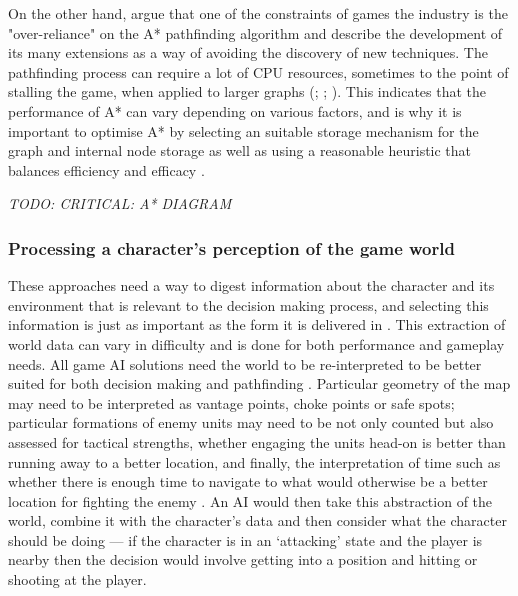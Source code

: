 \documentclass[11pt, a4paper]{article}
\begin{document}
On the other hand, \citeauthor{graham2003pathfinding} \parencite*[68]{graham2003pathfinding} argue that one of the constraints of games the industry is the "over-reliance" on the A* pathfinding algorithm and describe the development of its many extensions as a way of avoiding the discovery of new techniques. The pathfinding process can require a lot of CPU resources, sometimes to the point of stalling the game, when applied to larger graphs (\cite[127]{cui2011based}; \cite[110]{stentz1996map}; \cite[67]{graham2003pathfinding}). This indicates that the performance of A* can vary depending on various factors, and is why it is important to optimise A* by selecting an suitable storage mechanism for the graph and internal node storage as well as using a reasonable heuristic that balances efficiency and efficacy \parencite[228]{millington2019ai}.

\emph{TODO: CRITICAL: A* DIAGRAM}

\subsubsection{Processing a character's perception of the game world}
\label{subsubsec:processingACharactersPerception}

These approaches need a way to digest information about the character and its environment that is relevant to the decision making process, and selecting this information is just as important as the form it is delivered in \parencite[126]{cui2011based}. This extraction of world data can vary in difficulty \parencite[3]{diller2004behavior} and is done for both performance and gameplay needs. All game AI solutions need the world to be re-interpreted to be better suited for both decision making \parencite[2]{buro2004call} and pathfinding \parencite[3]{diller2004behavior}. Particular geometry of the map may need to be interpreted as vantage points, choke points or safe spots; particular formations of enemy units may need to be not only counted but also assessed for tactical strengths, whether engaging the units head-on is better than running away to a better location, and finally, the interpretation of time such as whether there is enough time to navigate to what would otherwise be a better location for fighting the enemy \parencite{buro2004call}. An AI would then take this abstraction of the world, combine it with the character's data and then consider what the character should be doing --- if the character is in an `attacking' state and the player is nearby then the decision would involve getting into a position and hitting or shooting at the player. 
\end{document}
